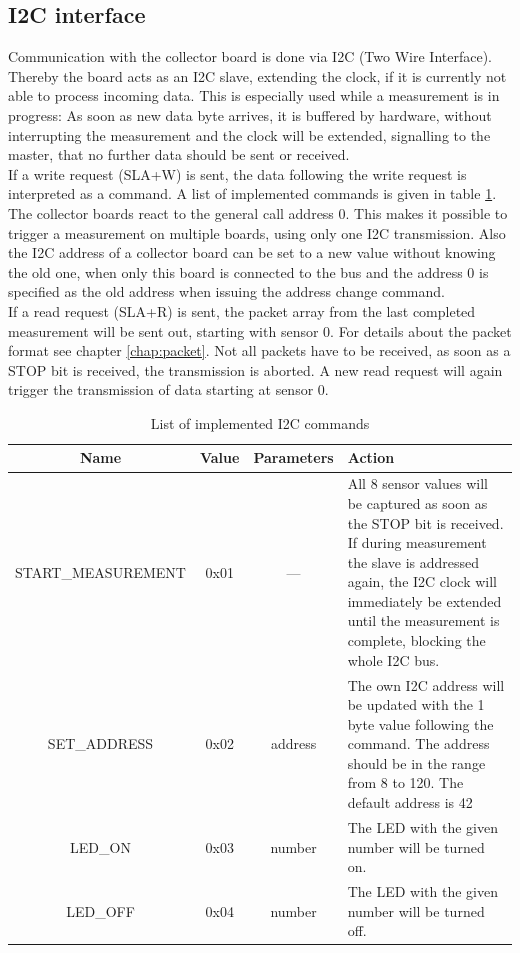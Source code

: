 \documentclass[a4paper]{scrreprt}
\begin{document}
\subsection{I2C interface}
Communication with the collector board is done via I2C (Two Wire Interface). Thereby the board acts as an
I2C slave, extending the clock, if it is currently not able to process incoming data.
This is especially used while a measurement is in progress: As soon as new data byte arrives,
it is buffered by hardware, without interrupting the measurement and the clock will be extended, signalling to the master, that no further data should be sent or received.\\
If a write request (SLA+W) is sent, the data following the write request is interpreted as a command. A list of implemented commands is given
in table \ref{tab:i2c}. The collector boards react to the general call address 0. This makes it possible to trigger a measurement
on multiple boards, using only one I2C transmission.
Also the I2C address of a collector board can be set to a new value without knowing the old one, when only this board is connected
to the bus and the address 0 is specified as the old address when issuing the address change command.\\
If a read request (SLA+R) is sent, the packet array from the last completed measurement will be sent out, starting with sensor 0.
For details about the packet format see chapter \ref{chap:packet}. Not all packets have to be received, as soon as a STOP bit is
received, the transmission is aborted. A new read request will again trigger the transmission of data starting at sensor 0.
\begin{table}[Hh!]
	\centering
	\begin{tabularx}{\textwidth}{ | c | c | c | X | }
		\hline
    Name & Value & Parameters & Action\\
		\hline
		\hline
    START\_MEASUREMENT & 0x01 & --- & All 8 sensor values will be
    captured as soon as the STOP bit is received. If during
    measurement
		the slave is addressed again, the I2C clock will immediately be extended until the measurement is complete, blocking the whole I2C bus.\\
		\hline
    SET\_ADDRESS & 0x02 & address & The own I2C address will be updated with the 1 byte value following the command. The address should
		be in the range from 8 to 120. The default address is 42\\
		\hline
    LED\_ON & 0x03 & number & The LED with the given number will be turned on.\\
		\hline
    LED\_OFF & 0x04 & number & The LED with the given number will be turned off.\\
		\hline
	\end{tabularx}
	\caption{List of implemented I2C commands}
	\label{tab:i2c}
\end{table}
\end{document}
